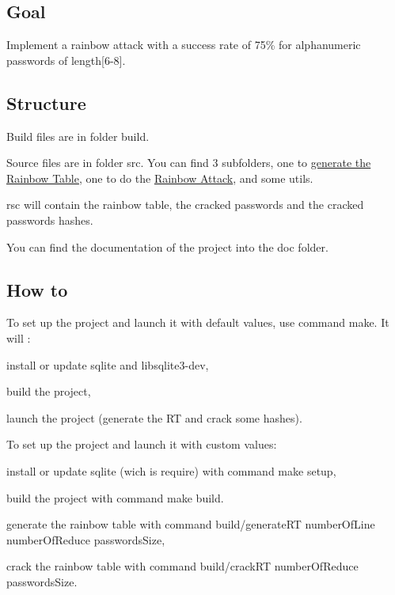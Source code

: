 \subsection*{Goal}

Implement a rainbow attack with a success rate of 75\% for alphanumeric passwords of length\mbox{[}6-\/8\mbox{]}.

\subsection*{Structure}

Build files are in folder {\ttfamily build}.

Source files are in folder {\ttfamily src}. You can find 3 subfolders, one to \hyperlink{namespacebe_1_1esi_1_1secl_1_1pn_abd22f0fb1b69636d22a3f698f3683085}{generate the Rainbow Table}, one to do the \hyperlink{namespacebe_1_1esi_1_1secl_1_1pn_a56fa00c405a4fb0e6446717fb1390493}{Rainbow Attack}, and some utils.

{\ttfamily rsc} will contain the rainbow table, the cracked passwords and the cracked passwords hashes.

You can find the documentation of the project into the {\ttfamily doc} folder.

\subsection*{How to}

To set up the project and launch it with default values, use command {\ttfamily make}. It will \+:
\begin{DoxyItemize}
\item install or update {\ttfamily sqlite} and {\ttfamily libsqlite3-\/dev},
\item build the project,
\item launch the project (generate the RT and crack some hashes).
\end{DoxyItemize}

To set up the project and launch it with custom values\+:
\begin{DoxyItemize}
\item install or update sqlite (wich is require) with command {\ttfamily make setup},
\item build the project with command {\ttfamily make build}.
\item generate the rainbow table with command {\ttfamily build/generate\+RT number\+Of\+Line number\+Of\+Reduce passwords\+Size},
\item crack the rainbow table with command {\ttfamily build/crack\+RT number\+Of\+Reduce passwords\+Size}.
\end{DoxyItemize}

